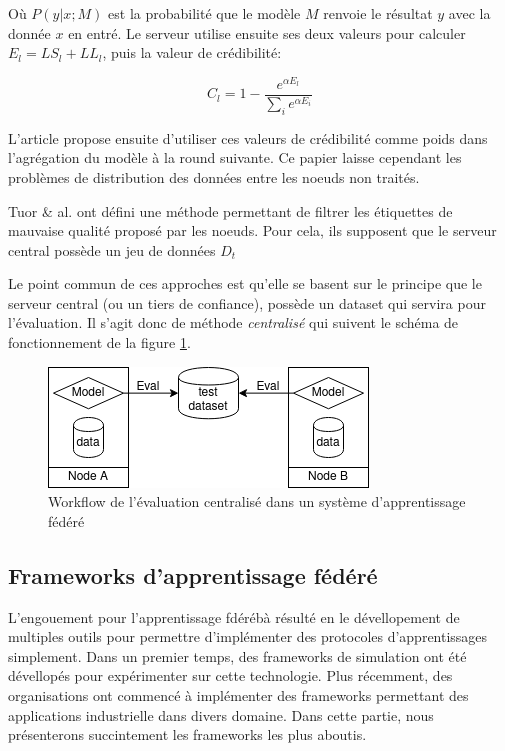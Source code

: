 \documentclass[stage3a]{tnreport} %
\begin{document}
Où $P(y|x;M)$ est la probabilité que le modèle $M$ renvoie le résultat $y$ avec la donnée $x$ en entré. Le serveur utilise ensuite ses deux valeurs pour calculer $E_l = LS_l + LL_l$, puis la valeur de crédibilité:

\begin{equation}
    C_l=1 - \frac{e^{\alpha E_l}}{\sum_i e^{\alpha E_i}}    
\end{equation}

L'article propose ensuite d'utiliser ces valeurs de crédibilité comme poids dans l'agrégation du modèle à la round suivante. Ce papier laisse cependant les problèmes de distribution des données entre les noeuds non traités.

Tuor \& al. ont défini une méthode permettant de filtrer les étiquettes de mauvaise qualité proposé par les noeuds. Pour cela, ils supposent que le serveur central possède un jeu de données $D_t$

Le point commun de ces approches est qu'elle se basent sur le  principe que le serveur central (ou un tiers de confiance), possède un dataset qui servira pour l'évaluation. Il s'agit donc de méthode \textit{centralisé} qui suivent le schéma de fonctionnement de la figure \ref{fig:centralised_evaluation}.

\begin{figure}[h]
  \centering
  \includegraphics{figures/centralised_eval.png}
  \caption{Workflow de l'évaluation centralisé dans un système d'apprentissage fédéré}
  \label{fig:centralised_evaluation}
\end{figure}


\subsection{Frameworks d'apprentissage fédéré}

L'engouement pour l'apprentissage fdérébà résulté en le dévellopement de multiples outils pour permettre d'implémenter des protocoles d'apprentissages simplement. Dans un premier temps, des frameworks de simulation ont été dévellopés pour expérimenter sur cette technologie. Plus récemment, des organisations ont commencé à implémenter des frameworks permettant des applications industrielle dans divers domaine. Dans cette partie, nous présenterons succintement les frameworks les plus aboutis.
\end{document}
